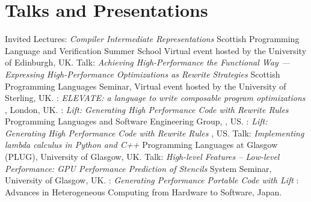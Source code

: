\section{Talks and Presentations}
  {Invited Lectures: \emph{Compiler Intermediate Representations}\newline
  \small Scottish Programming Language and Verification Summer School\newline
  Virtual event hosted by the University of Edinburgh, UK.}
  {Talk: \emph{Achieving High-Performance the Functional Way — Expressing High-Performance Optimizations as Rewrite Strategies}\newline
  \small Scottish Programming Languages Seminar, Virtual event hosted by the University of Sterling, UK.}
  {: \emph{ ELEVATE: a language to write composable program optimizations}\newline
  \small {}, London, UK.}
  {: \emph{Lift: Generating High Performance Code with Rewrite Rules}\newline
  \small Programming Languages and Software Engineering Group, , US.}
  {: \emph{Lift: Generating High Performance Code with Rewrite Rules}\newline
    \small {}, US.}
         {Talk: \emph{Implementing lambda calculus in Python and C++}\newline
          \small Programming Languages at Glasgow (PLUG), University of Glasgow, UK.}
         {Talk: \emph{High-level Features – Low-level Performance: GPU Performance Prediction of Stencils}\newline
          \small System Seminar, University of Glasgow, UK.}
         {:
          \emph{Generating Performance Portable Code with Lift}\newline
         \small {}: Advances in Heterogeneous Computing from Hardware to Software, Japan.}
